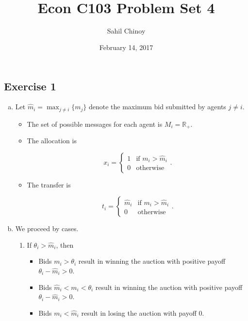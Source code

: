 \documentclass{article}
\title{Econ C103 Problem Set 4}
\author{Sahil Chinoy}
\date{February 14, 2017}
\begin{document}
\maketitle{}

\subsection*{Exercise 1}

\begin{enumerate}[(a)]
	\item

	Let $\hat{m}_i = \max_{j \neq i} \{m_j\}$ denote the maximum bid submitted by agents $j \neq i$.

	\begin{itemize}

		\item

		The set of possible messages for each agent is $M_i = \mathbb{R}_+$.

		\item

		The allocation is

		$$x_i = 
			\begin{cases} 
		      1 & \text{if } m_i > \hat{m}_i \\
		      0 & \text{otherwise}
		   \end{cases}.
		$$

		\item

		The transfer is

		$$t_i = 
			\begin{cases} 
		      \hat{m}_i & \text{if } m_i > \hat{m}_i \\
		      0 & \text{otherwise}
		   \end{cases}.
		$$

	\end{itemize}

	\item

	We proceed by cases.

	\begin{enumerate}[1.]

		\item

		If $\theta_i > \hat{m}_i$, then

		\begin{itemize}
			\item Bids $m_i > \theta_i$ result in winning the auction with positive payoff $\theta_i - \hat{m}_i > 0$.
			\item Bids $\hat{m}_i < m_i < \theta_i$ result in winning the auction with positive payoff $\theta_i - \hat{m}_i > 0$.
			\item Bids $m_i < \hat{m}_i$ result in losing the auction with payoff 0.
		\end{itemize}


\end{enumerate}
\end{enumerate}
\end{document}
